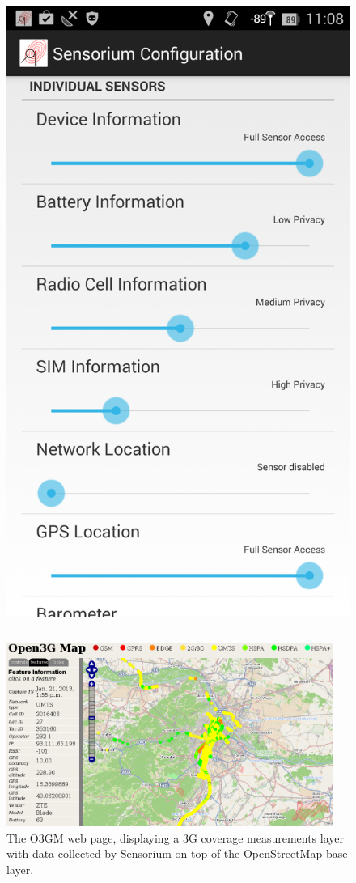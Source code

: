 \documentclass{beamer}
\begin{document}
\begin{frame}
\begin{columns}
		\begin{figure}
			\includegraphics[width=0.6\columnwidth]{../../chapters/06-mobilestreamingmeasurements/images/sensorium-settings.png}
		\end{figure}
	\end{columns}
\end{frame}

\begin{frame}
	\begin{figure}
		\includegraphics[height=6cm]{../../chapters/06-mobilestreamingmeasurements/images/o3gm.png}
		\caption{The O3GM web page, displaying a 3G coverage measurements layer with data collected by Sensorium on top of the OpenStreetMap base layer.}
	\end{figure}
\end{frame}
\end{document}
